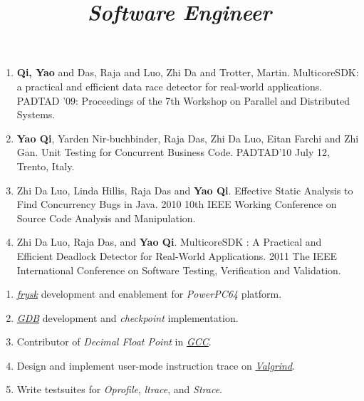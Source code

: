 \begin{resume}
\begin{position}
\begin{enumerate}
\item[] \textbf{Qi, Yao} and Das, Raja and Luo, Zhi Da and Trotter, Martin.  MulticoreSDK: a practical and efficient data race detector for real-world applications.  PADTAD '09: Proceedings of the 7th Workshop on Parallel and Distributed Systems.
\item[] \textbf{Yao Qi}, Yarden Nir-buchbinder, Raja Das, Zhi Da Luo, Eitan Farchi and Zhi Gan.  Unit Testing for Concurrent Business Code.  PADTAD’10 July 12, Trento, Italy.
\item[] Zhi Da Luo, Linda Hillis, Raja Das and \textbf{Yao Qi}. Effective Static Analysis to Find Concurrency Bugs in Java.  2010 10th IEEE Working Conference on Source Code Analysis and Manipulation.
\item[] Zhi Da Luo, Raja Das, and \textbf{Yao Qi}.  MulticoreSDK : A Practical and Efficient Deadlock Detector for Real-World Applications.  2011 The IEEE International Conference on Software Testing, Verification and Validation.
\end{enumerate}
\end{position}

\title{\emph{Software Engineer}}
\begin{position}
\begin{enumerate}
\item[] \href{http://www.sourceware.org/frysk}{\emph{frysk}} development and enablement for \emph{PowerPC64} platform.
\item[] \href{http://www.sourceware.org/gdb}{\emph{GDB}} development and \emph{checkpoint} implementation.
\item[] Contributor of \emph{Decimal Float Point} in \href{http://gcc.gnu.org}{\emph{GCC}}.
\item[] Design and implement user-mode instruction trace on \href{http://www.valgrind.org/}{\emph{Valgrind}}.
\item[] Write testsuites for \emph{Oprofile}, \emph{ltrace}, and \emph{Strace}.
\end{enumerate}
\end{position}



\end{resume}
